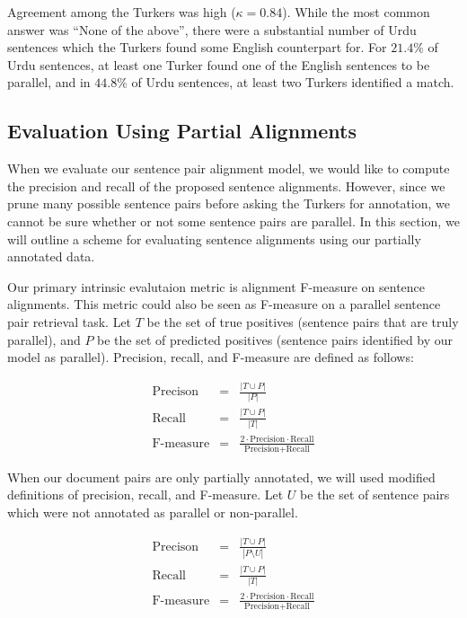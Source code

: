\documentclass[11pt,letterpaper]{article}
\begin{document}
Agreement among the Turkers was high ($\kappa = 0.84$). While the most common
answer was ``None of the above'', there were a substantial number of Urdu
sentences which the Turkers found some English counterpart for. For $21.4\%$ of Urdu
sentences, at least one Turker found one of the English sentences to be
parallel, and in $44.8\%$ of Urdu sentences, at least two Turkers identified a match.


\subsection{Evaluation Using Partial Alignments}
\label{sec:partial}
When we evaluate our sentence pair alignment model, we would like to compute the
precision and recall of the proposed sentence alignments. However, since we
prune many possible sentence pairs before asking the Turkers for annotation, we
cannot be sure whether or not some sentence pairs are parallel. In this section,
we will outline a scheme for evaluating sentence alignments using our partially
annotated data.

Our primary intrinsic evalutaion metric is alignment F-measure on sentence
alignments. This metric could also be seen as F-measure on a parallel sentence
pair retrieval task. Let $T$ be the set of true positives (sentence pairs that
are truly parallel), and $P$ be the set of predicted positives (sentence pairs
identified by our model as parallel). Precision, recall, and F-measure are
defined as follows:

\begin{align*}
\mbox{Precison}&=& \frac{|T \cup P|}{|P|}\\
\mbox{Recall}&=& \frac{|T \cup P|}{|T|}\\
\mbox{F-measure}&=& \frac{2 \cdot \mbox{Precision} \cdot
\mbox{Recall}}{\mbox{Precision} + \mbox{Recall}}
\end{align*}

When our document pairs are only partially annotated, we will used modified
definitions of precision, recall, and F-measure. Let $U$ be the set of sentence
pairs which were not annotated as parallel or non-parallel.

\begin{align*}
\mbox{Precison}&=& \frac{|T \cup P|}{|P \setminus U|}\\
\mbox{Recall}&=& \frac{|T \cup P|}{|T|}\\
\mbox{F-measure}&=& \frac{2 \cdot \mbox{Precision} \cdot
\mbox{Recall}}{\mbox{Precision} + \mbox{Recall}}
\end{align*}
\end{document}
